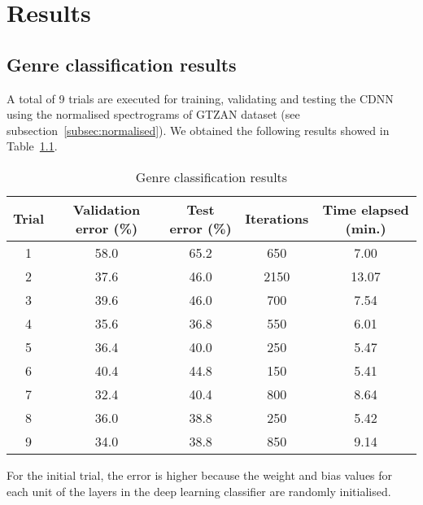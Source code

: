 \chapter{Results}
\label{ch:results}

\section{Genre classification results}
A total of 9 trials are executed for training, validating and testing the CDNN using the normalised spectrograms of GTZAN dataset (see subsection~\ref{subsec:normalised}). We obtained the following results showed in Table~\ref{table:genre}.
\begin{table}[h!]
	\caption{Genre classification results} %
	\centering %
	\begin{tabular}{c c c c c} %
		\hline\hline %
		Trial & Validation error (\%) & Test error (\%) & Iterations & Time elapsed (min.) \\ [0.5ex] %
		\hline %
		1 & 58.0 & 65.2 & 650 & 7.00 \\ %
		2 & 37.6 & 46.0 & 2150 & 13.07 \\
		3 & 39.6 & 46.0 & 700 & 7.54 \\
		4 & 35.6 & 36.8 & 550 & 6.01 \\
		5 & 36.4 & 40.0 & 250 & 5.47 \\
		6 & 40.4 & 44.8 & 150 & 5.41 \\
		7 & 32.4 & 40.4 & 800 & 8.64 \\
		8 & 36.0 & 38.8 & 250 & 5.42 \\
		9 & 34.0 & 38.8 & 850 & 9.14 \\ [1ex] %
		\hline %
	\end{tabular}
	\label{table:genre} %
\end{table}

For the initial trial, the error is higher because the weight and bias values for each unit of the layers in the deep learning classifier are randomly initialised.

